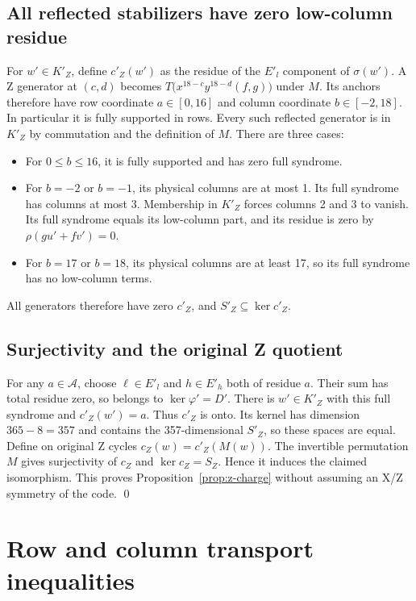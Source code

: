 \documentclass{article}
\begin{document}
\subsection{All reflected stabilizers have zero low-column residue}\label{sec:z-stabilizers}

For \(w'\in K'_Z\), define \(c'_Z(w')\) as the residue of the
\(E'_l\) component of \(\sigma(w')\).
A Z generator at \((c,d)\) becomes
\(T\bigl(x^{18-c}y^{18-d}(f,g)\bigr)\) under \(M\).
Its anchors therefore have row coordinate \(a\in[0,16]\) and column
coordinate \(b\in[-2,18]\). In particular it is fully supported in rows.
Every such reflected generator is in \(K'_Z\) by commutation and the
definition of \(M\). There are three cases:
\begin{itemize}
  \item For \(0\le b\le 16\), it is fully supported and has zero full syndrome.
  \item For \(b=-2\) or \(b=-1\), its physical columns are at most 1.
    Its full syndrome has columns at most 3. Membership in \(K'_Z\)
    forces columns 2 and 3 to vanish. Its full syndrome equals its
    low-column part, and its residue is zero by \(\rho(gu'+fv')=0\).
  \item For \(b=17\) or \(b=18\), its physical columns are at least 17,
    so its full syndrome has no low-column terms.
\end{itemize}

All generators therefore have zero \(c'_Z\), and
\(S'_Z\subseteq\ker c'_Z\).

\subsection{Surjectivity and the original Z quotient}\label{sec:z-quotient}

For any \(a\in\mathcal{A}\), choose \(\ell\in E'_l\) and \(h\in E'_h\)
both of residue \(a\). Their sum has total residue zero, so belongs to
\(\ker\varphi'=D'\). There is \(w'\in K'_Z\) with this full syndrome and
\(c'_Z(w')=a\). Thus \(c'_Z\) is onto.
Its kernel has dimension \(365-8=357\) and contains the
357-dimensional \(S'_Z\), so these spaces are equal.
Define on original Z cycles \(c_Z(w)=c'_Z(M(w))\).
The invertible permutation \(M\) gives surjectivity of \(c_Z\) and
\(\ker c_Z=S_Z\). Hence it induces the claimed isomorphism.
This proves Proposition~\ref{prop:z-charge} without assuming an X/Z symmetry of the
code. \qed

\section{Row and column transport inequalities}\label{sec:transport}
\end{document}
